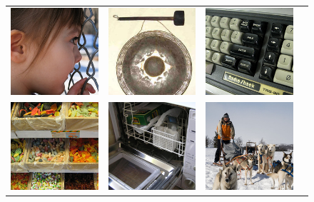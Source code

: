 \documentclass{beamer}
\begin{document}
\begin{frame}
\begin{figure}
{\begin{tabular}{cccc}
\includegraphics[width = 1.5in]{./images/imagenet/n03000134_789.JPEG} &
\includegraphics[width = 1.5in]{./images/imagenet/n03017168_743.JPEG} &
\includegraphics[width = 1.5in]{./images/imagenet/n03085013_2149.JPEG} \\
\includegraphics[width = 1.5in]{./images/imagenet/n03089624_632.JPEG} &
\includegraphics[width = 1.5in]{./images/imagenet/n03207941_946.JPEG} &
\includegraphics[width = 1.5in]{./images/imagenet/n03218198_298.JPEG} &

\end{tabular}}
\end{figure}
\end{frame}
\end{document}
